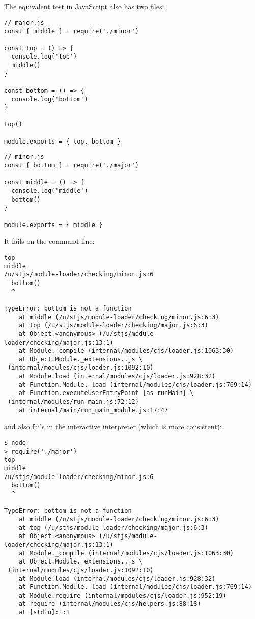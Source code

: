 \documentclass[krantzl]{krantz}
\begin{document}
The equivalent test in JavaScript also has two files:


\begin{lstlisting}[frame=tblr]
// major.js
const { middle } = require('./minor')

const top = () => {
  console.log('top')
  middle()
}

const bottom = () => {
  console.log('bottom')
}

top()

module.exports = { top, bottom }
\end{lstlisting}



\begin{lstlisting}[frame=tblr]
// minor.js
const { bottom } = require('./major')

const middle = () => {
  console.log('middle')
  bottom()
}

module.exports = { middle }
\end{lstlisting}



\noindent It fails on the command line:


\begin{lstlisting}[frame=tblr,backgroundcolor=\color{black!5}]
top
middle
/u/stjs/module-loader/checking/minor.js:6
  bottom()
  ^

TypeError: bottom is not a function
    at middle (/u/stjs/module-loader/checking/minor.js:6:3)
    at top (/u/stjs/module-loader/checking/major.js:6:3)
    at Object.<anonymous> (/u/stjs/module-loader/checking/major.js:13:1)
    at Module._compile (internal/modules/cjs/loader.js:1063:30)
    at Object.Module._extensions..js \
 (internal/modules/cjs/loader.js:1092:10)
    at Module.load (internal/modules/cjs/loader.js:928:32)
    at Function.Module._load (internal/modules/cjs/loader.js:769:14)
    at Function.executeUserEntryPoint [as runMain] \
 (internal/modules/run_main.js:72:12)
    at internal/main/run_main_module.js:17:47
\end{lstlisting}



\noindent and also fails in the interactive interpreter
(which is more consistent):


\begin{lstlisting}[frame=tblr,backgroundcolor=\color{black!5}]
$ node
> require('./major')
top
middle
/u/stjs/module-loader/checking/minor.js:6
  bottom()
  ^

TypeError: bottom is not a function
    at middle (/u/stjs/module-loader/checking/minor.js:6:3)
    at top (/u/stjs/module-loader/checking/major.js:6:3)
    at Object.<anonymous> (/u/stjs/module-loader/checking/major.js:13:1)
    at Module._compile (internal/modules/cjs/loader.js:1063:30)
    at Object.Module._extensions..js \
 (internal/modules/cjs/loader.js:1092:10)
    at Module.load (internal/modules/cjs/loader.js:928:32)
    at Function.Module._load (internal/modules/cjs/loader.js:769:14)
    at Module.require (internal/modules/cjs/loader.js:952:19)
    at require (internal/modules/cjs/helpers.js:88:18)
    at [stdin]:1:1
\end{lstlisting}
\end{document}
